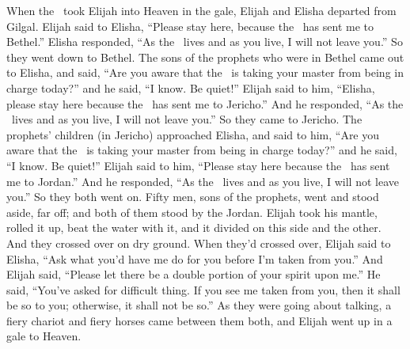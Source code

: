 
\begin{inparaenum}
   When the \lord\ took Elijah into Heaven in the gale, Elijah and Elisha departed from Gilgal.%
   Elijah said to Elisha, ``Please stay here, because the \lord\ has sent me to Bethel.'' Elisha responded, ``As the \lord\ lives and as you live, I will not leave you.'' So they went down to Bethel.%
   The sons of the prophets who were in Bethel came out to Elisha, and said, ``Are you aware that the \lord\ is taking your master from being in charge today?'' and he said, ``I know. Be quiet!''%
   Elijah said to him, ``Elisha, please stay here because the \lord\ has sent me to Jericho.'' And he responded, ``As the \lord\ lives and as you live, I will not leave you.'' So they came to Jericho.%
   The prophets' children (in Jericho) approached Elisha, and said to him, ``Are you aware that the \lord\ is taking your master from being in charge today?'' and he said, ``I know. Be quiet!''%
   Elijah said to him, ``Please stay here because the \lord\ has sent me to Jordan.'' And he responded, ``As the \lord\ lives and as you live, I will not leave you.'' So they both went on.%
   Fifty men, sons of the prophets, went and stood aside, far off; and both of them stood by the Jordan.%
   Elijah took his mantle, rolled it up, beat the water with it, and it divided on this side and the other. And they crossed over on dry ground.%
   When they'd crossed over, Elijah said to Elisha, ``Ask what you'd have me do for you before I'm taken from you.'' And Elijah said, ``Please let there be a double portion of your spirit upon me.''%
   He said, ``You've asked for difficult thing. If you see me taken from you, then it shall be so to you; otherwise, it shall not be so.''%
   As they were going about talking, a fiery chariot and fiery horses came between them both, and Elijah went up in a gale to Heaven.%

\end{inparaenum}
